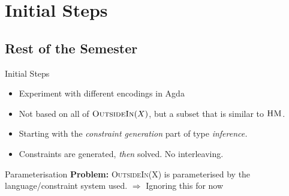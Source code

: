 \documentclass{beamer}
\begin{document}
\section{Initial Steps}
\subsection {Rest of the Semester}
\begin{frame}{Initial Steps}
	\begin{itemize}
		\item Experiment with different encodings in Agda 
		\item Not based on all of $\textsc{OutsideIn}(X)$, but a subset that is similar to $\textsc{HM}$. 
		\item Starting with the \emph{constraint generation} part of type \emph{inference.}
		\item Constraints are generated, \emph{then} solved. No interleaving.		
	\end{itemize}
\end{frame}
\begin{frame}{Parameterisation}
\textbf{Problem:} \textsc{OutsideIn}(X) is parameterised by the language/constraint system used.
			\pause
		$\Longrightarrow$ Ignoring this for now
\end{frame}
\end{document}
